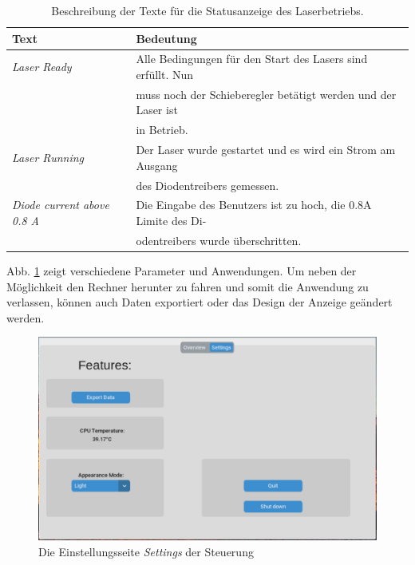 \begin{table}[H]
    \centering
    \begin{tabular}{l|l}
        \textbf{Text}&                          \textbf{Bedeutung}\\
        \hline
         \textit{Laser Ready}&                  Alle Bedingungen für den Start des Lasers sind erfüllt. Nun\\
         &                                      muss noch der Schieberegler betätigt werden und der Laser ist\\
         &                                      in Betrieb.\\
         \textit{Laser Running}&                Der Laser wurde gestartet und es wird ein Strom am Ausgang\\
         &                                      des Diodentreibers gemessen.\\
         \textit{Diode current above 0.8 A}&    Die Eingabe des Benutzers ist zu hoch, die 0.8A Limite des Di-\\
         &                                      odentreibers wurde überschritten.                                
    \end{tabular}
    \caption{Beschreibung der Texte für die Statusanzeige des Laserbetriebs.}
    \label{tab:my_label}
\end{table}

Abb. \ref{fig:settings_sw} zeigt verschiedene Parameter und Anwendungen. Um neben der Möglichkeit den Rechner herunter zu fahren und somit die Anwendung zu verlassen, können auch Daten exportiert oder das Design der Anzeige geändert werden.

\begin{figure}[H]
    \centering
    \includegraphics[scale=0.3, trim={1mm 1mm 1mm 2mm}, clip]{98_images/window_settings_large_02.PNG}
    \caption{Die Einstellungsseite \textit{Settings} der Steuerung}
    \label{fig:settings_sw}
\end{figure}

